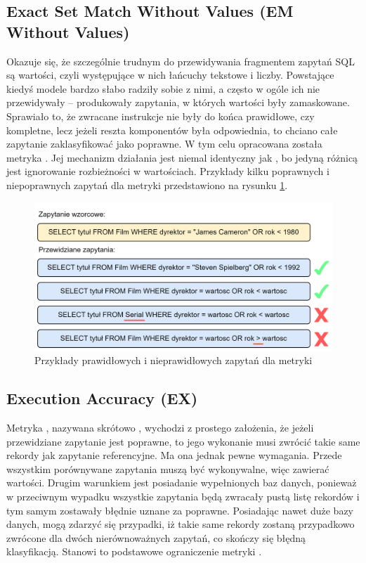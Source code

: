 \subsection{Exact Set Match Without Values (EM Without Values)}
Okazuje się, że szczególnie trudnym do przewidywania fragmentem zapytań SQL są wartości, czyli występujące w nich łańcuchy tekstowe i liczby. Powstające kiedyś modele bardzo słabo radziły sobie z nimi, a często w ogóle ich nie przewidywały -- produkowały zapytania, w których wartości były zamaskowane. Sprawiało to, że zwracane instrukcje nie były do końca prawidłowe, czy kompletne, lecz jeżeli reszta komponentów była odpowiednia, to chciano całe zapytanie zaklasyfikować jako poprawne. W tym celu opracowana została metryka . Jej mechanizm działania jest niemal identyczny jak , bo jedyną różnicą jest ignorowanie rozbieżności w wartościach. Przykłady kilku poprawnych i niepoprawnych zapytań dla metryki  przedstawiono na rysunku \ref{fig:em-without-values}.

\begin{figure}[ht!]
  \centering
  \includegraphics[width=0.85\linewidth]{images/em_without_values.png}
  \caption{Przykłady prawidłowych i nieprawidłowych zapytań dla metryki }
  \label{fig:em-without-values}
\end{figure}

\subsection{Execution Accuracy (EX)}
\label{text:execution_accuracy}
Metryka , nazywana skrótowo , wychodzi z prostego założenia, że jeżeli przewidziane zapytanie jest poprawne, to jego wykonanie musi zwrócić takie same rekordy jak zapytanie referencyjne. Ma ona jednak pewne wymagania. Przede wszystkim porównywane zapytania muszą być wykonywalne, więc zawierać wartości. Drugim warunkiem jest posiadanie wypełnionych baz danych, ponieważ w przeciwnym wypadku wszystkie zapytania będą zwracały pustą listę rekordów i tym samym zostawały błędnie uznane za poprawne. Posiadając nawet duże bazy danych, mogą zdarzyć się przypadki, iż takie same rekordy zostaną przypadkowo zwrócone dla dwóch nierównoważnych zapytań, co skończy się błędną klasyfikacją. Stanowi to podstawowe ograniczenie metryki .

